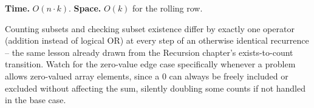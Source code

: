 \begin{complexitybox}
\textbf{Time.} $O(n \cdot k)$.
\textbf{Space.} $O(k)$ for the rolling row.
\end{complexitybox}

\begin{takeawaybox}
Counting subsets and checking subset existence differ by exactly one
operator (addition instead of logical OR) at every step of an otherwise
identical recurrence -- the same lesson already drawn from the
Recursion chapter's exists-to-count transition.
Watch for the zero-value edge case specifically whenever a problem allows
zero-valued array elements, since a $0$ can always be freely included or
excluded without affecting the sum, silently doubling some counts if not
handled in the base case.
\end{takeawaybox}
